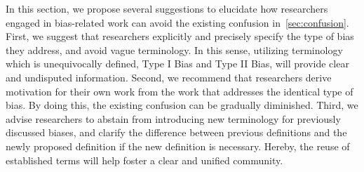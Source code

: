 \label{sec:suggestion}
In this section, we propose several suggestions to elucidate how researchers engaged in bias-related work can avoid the existing confusion in~\cref{sec:confusion}.
First, we suggest that researchers explicitly and precisely specify the type of bias they address, and avoid vague terminology. 
In this sense, utilizing terminology which is unequivocally defined, \eg Type I Bias and Type II Bias, will provide clear and undisputed information.
Second, we recommend that researchers derive motivation for their own work from the work that addresses the identical type of bias.
By doing this, the existing confusion can be gradually diminished.
Third, we advise researchers to abstain from introducing new terminology for previously discussed biases, and clarify the difference between previous definitions and the newly proposed definition if the new definition is necessary.
Hereby, the reuse of established terms will help foster a clear and unified community.






